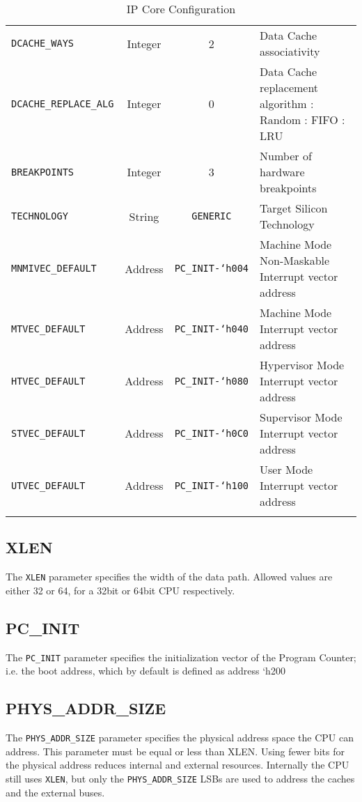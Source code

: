 \begin{longtable}[]{@{}lccp{6cm}@{}}
\texttt{DCACHE\_WAYS}         & Integer & 2                       & Data Cache associativity\tabularnewline
\texttt{DCACHE\_REPLACE\_ALG} & Integer & 0                       & Data Cache replacement algorithm
\newline0: Random
\newline1: FIFO
\newline2: LRU\tabularnewline
\texttt{BREAKPOINTS}          & Integer & 3                       & Number of hardware breakpoints\tabularnewline
\texttt{TECHNOLOGY}           & String  & \texttt{GENERIC}        & Target Silicon Technology\tabularnewline
\texttt{MNMIVEC\_DEFAULT}     & Address & \texttt{PC\_INIT-`h004} & Machine Mode Non-Maskable Interrupt vector address\tabularnewline
\texttt{MTVEC\_DEFAULT}       & Address & \texttt{PC\_INIT-`h040} & Machine Mode Interrupt vector address\tabularnewline
\texttt{HTVEC\_DEFAULT}       & Address & \texttt{PC\_INIT-`h080} & Hypervisor Mode Interrupt vector address\tabularnewline
\texttt{STVEC\_DEFAULT}       & Address & \texttt{PC\_INIT-`h0C0} & Supervisor Mode Interrupt vector address\tabularnewline
\texttt{UTVEC\_DEFAULT}       & Address & \texttt{PC\_INIT-`h100} & User Mode Interrupt vector address\tabularnewline
\bottomrule
\caption{IP Core Configuration}
\label{tab:ip-core-configuration}
\end{longtable}


\subsection{XLEN}\label{xlen}

The \texttt{XLEN} parameter specifies the width of the data path. Allowed values
are either 32 or 64, for a 32bit or 64bit CPU respectively.

\subsection{PC\_INIT}\label{pc_init}

The \texttt{PC\_INIT} parameter specifies the initialization vector of the
Program Counter; i.e. the boot address, which by default is defined as
address `h200

\subsection{PHYS\_ADDR\_SIZE}\label{phys_addr_size}

The \texttt{PHYS\_ADDR\_SIZE} parameter specifies the physical address space the
CPU can address. This parameter must be equal or less than XLEN. Using
fewer bits for the physical address reduces internal and external
resources. Internally the CPU still uses \texttt{XLEN}, but only the
\texttt{PHYS\_ADDR\_SIZE} LSBs are used to address the caches and the external
buses.

